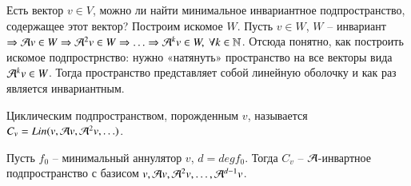 \documentclass[main]{subfiles}
\begin{document}
Есть вектор $v \in V$, можно ли найти минимальное инвариантное подпространство, содержащее этот вектор? Построим искомое $W$. Пусть $v\in W$, $W$ -- инвариант $\Rightarrow \mathcal{A} v \in W \Rightarrow {\mathcal{A}}^2 v \in W \Rightarrow \ldots \Rightarrow  {\mathcal{A}}^k v \in W, \ \forall k \in \mathbb{N}$.
Отсюда понятно, как построить искомое подпрострнство: нужно «натянуть» пространство на все векторы вида ${\mathcal{A}}^k v \in W$. Тогда пространство представляет собой линейную оболочку и как раз является инвариантным.

\begin{definition} 
    Циклическим подпространством, порожденным $v$, называется $C_v = Lin(v, \mathcal{A} v, {\mathcal{A}}^2 v, \ldots)$.
\end{definition}

\begin{proposition}
    Пусть $f_0$ -- минимальный аннулятор $v$, $d = deg f_0$. Тогда $C_v$ -- $\mathcal{A}$-инвартное подпространство с базисом
    $v, \mathcal{A} v, {\mathcal{A}}^2 v, \ldots, {\mathcal{A}}^{d-1} v$.
\end{proposition}
\end{document}
